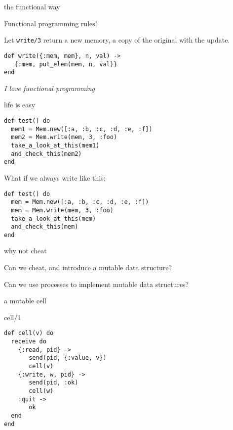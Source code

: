 \begin{frame}[fragile]{the functional way}

Functional programming rules!

\pause\vspace{10pt}
Let {\tt write/3} return a new memory, a copy of the original with the update.

\pause\vspace{10pt}
\begin{verbatim}
def write({:mem, mem}, n, val) ->
   {:mem, put_elem(mem, n, val}}
end
\end{verbatim}
\pause\vspace{40pt}

{\em I love functional programming}

\end{frame}

\begin{frame}[fragile]{life is easy}
\pause
\begin{verbatim}
def test() do
  mem1 = Mem.new([:a, :b, :c, :d, :e, :f])
  mem2 = Mem.write(mem, 3, :foo)
  take_a_look_at_this(mem1)
  and_check_this(mem2)
end
\end{verbatim}

\pause
What if we always write like this:

\begin{verbatim}
def test() do
  mem = Mem.new([:a, :b, :c, :d, :e, :f])
  mem = Mem.write(mem, 3, :foo)
  take_a_look_at_this(mem)
  and_check_this(mem)
end
\end{verbatim}


\end{frame}

\begin{frame}{why not cheat}

Can we cheat, and introduce a mutable data structure?

\pause\vspace{20pt}
Can we use processes to implement mutable data structures?

\end{frame}


\begin{frame}[fragile]{a mutable cell}

\begin{block}{cell/1}
 \begin{verbatim}
def cell(v) do
  receive do
    {:read, pid} ->
       send(pid, {:value, v})
       cell(v)
    {:write, w, pid} ->
       send(pid, :ok)
       cell(w)
    :quit ->
       ok
  end
end
 \end{verbatim}
\end{block}
\end{frame}

